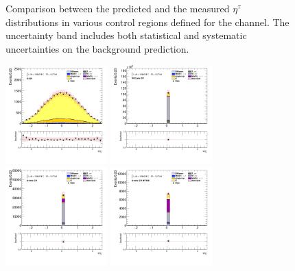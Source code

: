 \begin{figure}[!htp]
\begin{center}
			\end{center}
			\caption{
			Comparison between the predicted and the measured $\eta^{\tau}$ distributions in various control regions defined for the \taujets channel. The uncertainty band includes both statistical and systematic uncertainties on the background prediction. 
			}
			\label{fig:bkg-tau-eta-taujets}
		\end{figure}

		\begin{figure}[!htp]
			\begin{center}    
			\includegraphics[width=0.35\textwidth]{chapters/chapter6_HPlus/images/taujets/bjet_0_eta_TTBAR.png}
			\includegraphics[width=0.35\textwidth]{chapters/chapter6_HPlus/images/taujets/bjet_0_eta_WJETS.png} \\
			\includegraphics[width=0.35\textwidth]{chapters/chapter6_HPlus/images/taujets/bjet_0_eta_BVETO.png}
			\includegraphics[width=0.35\textwidth]{chapters/chapter6_HPlus/images/taujets/bjet_0_eta_BVETO_MT100.png} \\

\end{center}
\end{figure}
